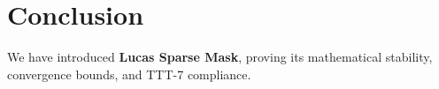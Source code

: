 \section{Conclusion}
We have introduced \textbf{Lucas Sparse Mask}, proving its mathematical stability, convergence bounds, and TTT-7 compliance.